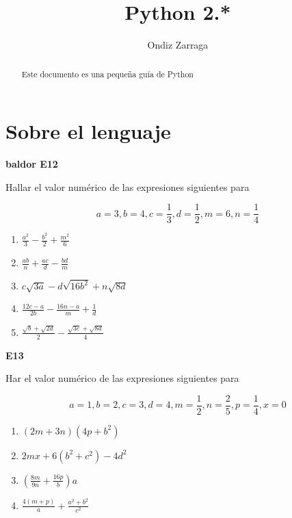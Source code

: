 \documentclass[a4paper,10pt]{article}
\title{Python 2.*}
\author{Ondiz Zarraga}
\begin{document}
\maketitle

\begin{abstract}
Este documento es una pequeña guía de Python 
\end{abstract}

\tableofcontents

\section{Sobre el lenguaje}

\textbf{baldor E12}

\hfill

Hallar el valor numérico de las expresiones siguientes para

$$
a = 3, b=4, c=\frac{1}{3}, d=\frac{1}{2}, m = 6, n=\frac{1}{4}
$$

\begin{enumerate}
\item $\frac{a^2}{3} - \frac{b^2}{2} + \frac{m^2}{6}$

\item $\frac{ab}{n} + \frac{ac}{d} - \frac{bd}{m}$

\item $c \sqrt{3a} - d \sqrt{16b^2} + n \sqrt{8d}$

\item  $\frac{12c-a}{2b} - \frac{16n-a}{m} + \frac{1}{d}$

\item  $\frac{\sqrt{b} + \sqrt{2d}}{2} - \frac{\sqrt{3c}+\sqrt{8d}}{4}$
\end{enumerate}

\textbf{ E13}

\hfill

Har el valor numérico de las expresiones siguientes para

$$
a = 1, b=2, c=3, d=4, m = \frac{1}{2}, n=\frac{2}{5}, p=\frac{1}{4}, x=0
$$

\begin{enumerate}
\item $(2m+3n)(4p+b^2)$

\item  $2mx + 6(b^2+c^2)-4d^2$

\item  $(\frac{8m}{9n} + \frac{16p}{b})a$

\item  $\frac{4(m+p)}{a} + \frac{a^2 + b^2}{c^2}$
\end{enumerate}
\end{document}
